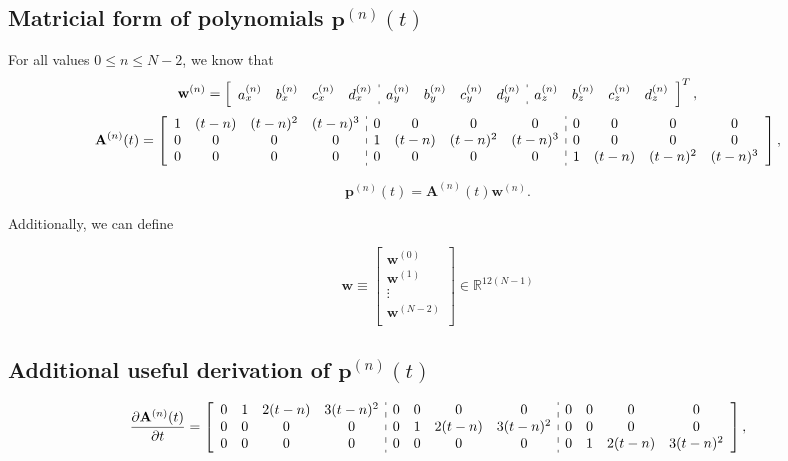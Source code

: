 \subsection{Matricial form of polynomials $\mathbf{p}^{(n)}(t)$}
For all values $0\leq n \leq N-2$, we know that
\begin{equation}
\mathbf{w}^{(n)}=
\left[
\begin{array}{cccc:cccc:cccc}
a_{x}^{(n)} & b_{x}^{(n)} & c_{x}^{(n)} & d_{x}^{(n)} & 
a_{y}^{(n)} & b_{y}^{(n)} & c_{y}^{(n)} & d_{y}^{(n)} & 
a_{z}^{(n)} & b_{z}^{(n)} & c_{z}^{(n)} & d_{z}^{(n)}
\end{array}
\right]^{T},
\end{equation}
\small
\begin{equation}\label{eq:Ant}
\mathbf{A}^{(n)}(t)=
\left[
\begin{array}{cccc:cccc:cccc}
1 & (t-n) & (t-n)^{2} & (t-n)^{3} &
0 & 0 & 0 & 0 &
0 & 0 & 0 & 0 \\
0 & 0 & 0 & 0 &
1 & (t-n) & (t-n)^{2} & (t-n)^{3} &
0 & 0 & 0 & 0 \\
0 & 0 & 0 & 0 &
0 & 0 & 0 & 0 &
1 & (t-n) & (t-n)^{2} & (t-n)^{3} 
\end{array}
\right],
\end{equation}
\normalsize

\begin{equation}\label{eq:primeder0}
\mathbf{p}^{(n)}(t)=
\mathbf{A}^{(n)}(t) \mathbf{w}^{(n)}.
\end{equation}

Additionally, we can define

\begin{equation}
\mathbf{w}
\equiv
\begin{bmatrix}
\mathbf{w}^{(0)}\\
\mathbf{w}^{(1)}\\
\vdots\\
\mathbf{w}^{(N-2)}\\
\end{bmatrix}
\in \mathbb{R}^{12(N-1)}
\end{equation}

\subsection{Additional useful derivation of $\mathbf{p}^{(n)}(t)$}

\small
\begin{equation}\label{eq:primeder1}
\frac{\partial \mathbf{A}^{(n)}(t)}{\partial t}=
\left[
\begin{array}{cccc:cccc:cccc}
0 & 1 & 2(t-n) & 3(t-n)^{2} &
0 & 0 & 0 & 0 &
0 & 0 & 0 & 0 \\
0 & 0 & 0 & 0 &
0 & 1 & 2(t-n) & 3(t-n)^{2} &
0 & 0 & 0 & 0 \\
0 & 0 & 0 & 0 &
0 & 0 & 0 & 0 &
0 & 1 & 2(t-n) & 3(t-n)^{2} 
\end{array}
\right],
\end{equation}
\normalsize

